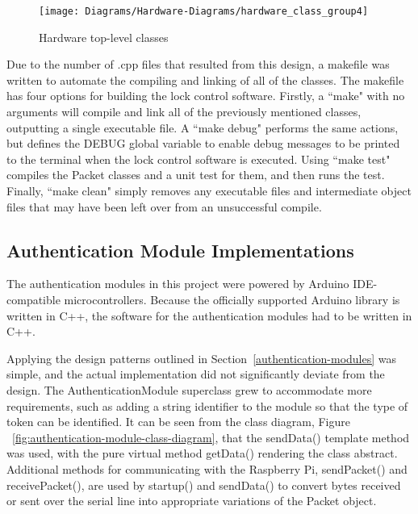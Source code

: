 \documentclass[12pt]{report}
\let\Oldsubsection\subsection
\renewcommand{\subsection}{\FloatBarrier\Oldsubsection}
\begin{document}
\begin{figure}
    \texttt{[image: Diagrams/Hardware-Diagrams/hardware\_class\_group4]}
    \caption{Hardware top-level classes}
    \label{fig:hardware-class-group4}
\end{figure}

Due to the number of .cpp files that resulted from this design, a makefile was written to automate the compiling and 
linking of all of the classes. The makefile has four options for building the lock control software. Firstly, a ``make" 
with no arguments will compile and link all of the previously mentioned classes, outputting a single executable file. A 
``make debug" performs the same actions, but defines the DEBUG global variable to enable debug messages to be printed 
to the terminal when the lock control software is executed. Using ``make test" compiles the Packet classes and a unit 
test for them, and then runs the test. Finally, ``make clean" simply removes any executable files and intermediate 
object files that may have been left over from an unsuccessful compile.

\subsection{Authentication Module Implementations} \label{authentication-modules-implementations}

The authentication modules in this project were powered by Arduino IDE-compatible microcontrollers. Because the 
officially supported Arduino library is written in C++, the software for the authentication modules had to be written 
in C++.

Applying the design patterns outlined in Section~\ref{authentication-modules} was simple, and the actual implementation 
did not significantly deviate from the design. The AuthenticationModule superclass grew to accommodate more 
requirements, such as adding a string identifier to the module so that the type of token can be identified. It can be 
seen from the class diagram, Figure ~\ref{fig:authentication-module-class-diagram}, that the sendData() template method 
was used, with the pure virtual method getData() rendering the class abstract. Additional methods for communicating 
with the Raspberry Pi, sendPacket() and receivePacket(), are used by startup() and sendData() to convert bytes received 
or sent over the serial line into appropriate variations of the Packet object.
\end{document}
